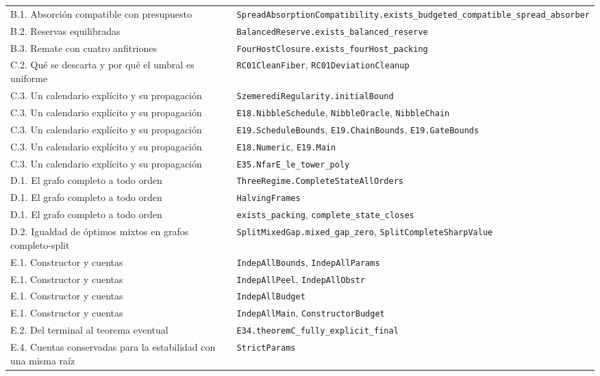 \documentclass[spanish,11pt,a4paper]{article}
\begin{document}
{\begin{longtable}[]{@{}
  >{\raggedright\arraybackslash}p{}
  >{\raggedright\arraybackslash}p{}@{}}
B.1. Absorción compatible con presupuesto &
\nolinkurl{SpreadAbsorptionCompatibility.exists_budgeted_compatible_spread_absorber} \\
B.2. Reservas equilibradas &
\nolinkurl{BalancedReserve.exists_balanced_reserve} \\
B.3. Remate con cuatro anfitriones &
\nolinkurl{FourHostClosure.exists_fourHost_packing} \\
C.2. Qué se descarta y por qué el umbral es uniforme &
\nolinkurl{RC01CleanFiber}, \nolinkurl{RC01DeviationCleanup} \\
C.3. Un calendario explícito y su propagación &
\nolinkurl{SzemerediRegularity.initialBound} \\
C.3. Un calendario explícito y su propagación &
\nolinkurl{E18.NibbleSchedule}, \nolinkurl{NibbleOracle},
\nolinkurl{NibbleChain} \\
C.3. Un calendario explícito y su propagación &
\nolinkurl{E19.ScheduleBounds}, \nolinkurl{E19.ChainBounds},
\nolinkurl{E19.GateBounds} \\
C.3. Un calendario explícito y su propagación & \nolinkurl{E18.Numeric},
\nolinkurl{E19.Main} \\
C.3. Un calendario explícito y su propagación &
\nolinkurl{E35.NfarE_le_tower_poly} \\
D.1. El grafo completo a todo orden &
\nolinkurl{ThreeRegime.CompleteStateAllOrders} \\
D.1. El grafo completo a todo orden & \nolinkurl{HalvingFrames} \\
D.1. El grafo completo a todo orden & \nolinkurl{exists_packing},
\nolinkurl{complete_state_closes} \\
D.2. Igualdad de óptimos mixtos en grafos completo-split &
\nolinkurl{SplitMixedGap.mixed_gap_zero},
\nolinkurl{SplitCompleteSharpValue} \\
E.1. Constructor y cuentas & \nolinkurl{IndepAllBounds},
\nolinkurl{IndepAllParams} \\
E.1. Constructor y cuentas & \nolinkurl{IndepAllPeel},
\nolinkurl{IndepAllObstr} \\
E.1. Constructor y cuentas & \nolinkurl{IndepAllBudget} \\
E.1. Constructor y cuentas & \nolinkurl{IndepAllMain},
\nolinkurl{ConstructorBudget} \\
E.2. Del terminal al teorema eventual &
\nolinkurl{E34.theoremC_fully_explicit_final} \\
E.4. Cuentas conservadas para la estabilidad con una misma raíz &
\nolinkurl{StrictParams} \\

\end{longtable}}
\end{document}

